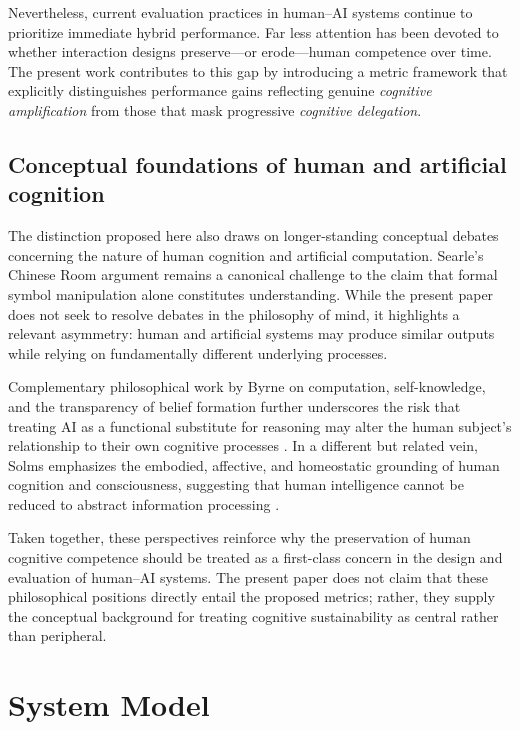 \documentclass[11pt,a4paper]{article}
\begin{document}
Nevertheless, current evaluation practices in human--AI systems continue to prioritize immediate hybrid performance. Far less attention has been devoted to whether interaction designs preserve---or erode---human competence over time. The present work contributes to this gap by introducing a metric framework that explicitly distinguishes performance gains reflecting genuine \emph{cognitive amplification} from those that mask progressive \emph{cognitive delegation}.

\subsection{Conceptual foundations of human and artificial cognition}

The distinction proposed here also draws on longer-standing conceptual debates concerning the nature of human cognition and artificial computation. Searle's Chinese Room argument \cite{searle1980} remains a canonical challenge to the claim that formal symbol manipulation alone constitutes understanding. While the present paper does not seek to resolve debates in the philosophy of mind, it highlights a relevant asymmetry: human and artificial systems may produce similar outputs while relying on fundamentally different underlying processes.

Complementary philosophical work by Byrne on computation, self-knowledge, and the transparency of belief formation further underscores the risk that treating AI as a functional substitute for reasoning may alter the human subject's relationship to their own cognitive processes \cite{byrne-minds-machines,byrne-kim-2012,byrne2018}. In a different but related vein, Solms emphasizes the embodied, affective, and homeostatic grounding of human cognition and consciousness, suggesting that human intelligence cannot be reduced to abstract information processing \cite{solms2021,solms-friston-2019}.

Taken together, these perspectives reinforce why the preservation of human cognitive competence should be treated as a first-class concern in the design and evaluation of human--AI systems. The present paper does not claim that these philosophical positions directly entail the proposed metrics; rather, they supply the conceptual background for treating cognitive sustainability as central rather than peripheral.

\section{System Model}
\end{document}
